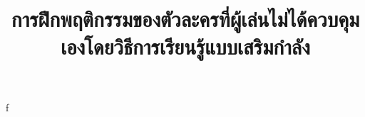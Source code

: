 \documentclass[24pt, a4, paper]{report}
\title{\textbf{การฝึกพฤติกรรมของตัวละครที่ผู้เล่นไม่ได้ควบคุมเองโดยวิธีการเรียนรู้แบบเสริมกำลัง}}
\begin{document}
\maketitle
f
    
\end{document}
